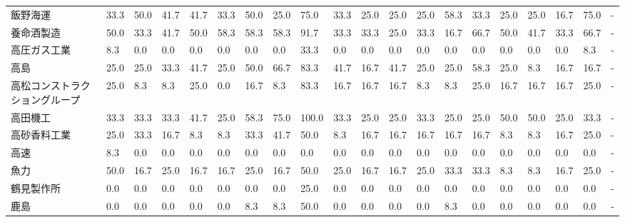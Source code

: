 \begin{tabular}{llllllllllllllllllll}
飯野海運            &   33.3 &   50.0 &      41.7 &      41.7 &       33.3 &   50.0 &   25.0 &   75.0 &    33.3 &    25.0 &   25.0 &  25.0 &   58.3 &    33.3 &    25.0 &  25.0 &  16.7 &  75.0 &     - \\
養命酒製造           &   50.0 &   33.3 &      41.7 &      50.0 &       58.3 &   58.3 &   58.3 &   91.7 &    33.3 &    33.3 &   25.0 &  33.3 &   16.7 &    66.7 &    50.0 &  41.7 &  33.3 &  66.7 &     - \\
高圧ガス工業          &    8.3 &    0.0 &       0.0 &       0.0 &        0.0 &    0.0 &    0.0 &   33.3 &     0.0 &     0.0 &    0.0 &   0.0 &    0.0 &     0.0 &     0.0 &   0.0 &   0.0 &   8.3 &     - \\
高島              &   25.0 &   25.0 &      33.3 &      41.7 &       25.0 &   50.0 &   66.7 &   83.3 &    41.7 &    16.7 &   41.7 &  25.0 &   25.0 &    58.3 &    25.0 &   8.3 &  16.7 &  16.7 &     - \\
高松コンストラクショングループ &   25.0 &    8.3 &       8.3 &      25.0 &        0.0 &   16.7 &    8.3 &   83.3 &    16.7 &    16.7 &   16.7 &   8.3 &    8.3 &    25.0 &    16.7 &  16.7 &  16.7 &  25.0 &     - \\
高田機工            &   33.3 &   33.3 &      33.3 &      41.7 &       25.0 &   58.3 &   75.0 &  100.0 &    33.3 &    25.0 &   25.0 &  33.3 &   25.0 &    25.0 &    50.0 &  50.0 &  25.0 &  33.3 &     - \\
高砂香料工業          &   25.0 &   33.3 &      16.7 &       8.3 &        8.3 &   33.3 &   41.7 &   50.0 &     8.3 &    16.7 &   16.7 &  16.7 &   16.7 &    16.7 &     8.3 &   8.3 &  16.7 &  25.0 &     - \\
高速              &    8.3 &    0.0 &       0.0 &       0.0 &        0.0 &    0.0 &    0.0 &    0.0 &     0.0 &     0.0 &    0.0 &   0.0 &    0.0 &     0.0 &     0.0 &   0.0 &   0.0 &   0.0 &     - \\
魚力              &   50.0 &   16.7 &      25.0 &      16.7 &       16.7 &   25.0 &   16.7 &   50.0 &    25.0 &    16.7 &   16.7 &  25.0 &   33.3 &    33.3 &     8.3 &   8.3 &  16.7 &  25.0 &     - \\
鶴見製作所           &    0.0 &    0.0 &       0.0 &       0.0 &        0.0 &    0.0 &    0.0 &   25.0 &     0.0 &     0.0 &    0.0 &   0.0 &    0.0 &     0.0 &     0.0 &   0.0 &   0.0 &   0.0 &     - \\
鹿島              &    0.0 &    0.0 &       0.0 &       0.0 &        0.0 &    8.3 &    8.3 &   50.0 &     0.0 &     0.0 &    0.0 &   0.0 &    8.3 &     0.0 &     0.0 &   0.0 &   0.0 &   0.0 &     - \\

\end{tabular}

